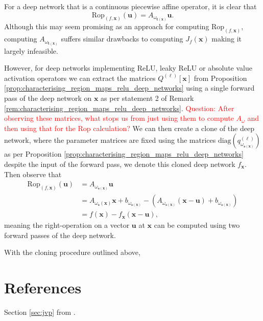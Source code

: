 For a deep network that is a continuous piecewise affine operator, it is clear that $$\mathrm{Rop}_{(f,\mathbf{x})}(\mathbf{u})=A_{\omega_{\mathbf{t}(\mathbf{x})}}\mathbf{u}.$$Although this may seem promising as an approach for computing $\mathrm{Rop}_{(f,\mathbf{x})}$, computing $A_{\omega_{\mathbf{t}(\mathbf{x})}}$ suffers similar drawbacks to computing $J_f(\mathbf{x})$ making it largely infeasible. 

However, for deep networks implementing ReLU, leaky ReLU or absolute value activation operators we can extract the matrices $Q^{(\ell)}[\mathbf{x}]$ from Proposition \ref{prop:characterising_region_maps_relu_deep_networks} using a single forward pass of the deep network on $\mathbf{x}$ as per statement 2 of Remark \ref{rem:characterising_region_maps_relu_deep_networks}. \textcolor{Red}{Question: After observing these matrices, what stops us from just using them to compute $A_{\omega}$ and then using that for the Rop calculation?} We can then create a clone of the deep network, where the parameter matrices are fixed using the matrices $\mathrm{diag}\left(q_{\omega_{\mathbf{s}(\mathbf{x})}}^{(\ell)}\right)$ as per Proposition \ref{prop:characterising_region_maps_relu_deep_networks} despite the input of the forward pass, we denote this cloned deep network $f_{\mathbf{x}}$. Then observe that 
\begin{align*}
    \mathrm{Rop}_{(f,\mathbf{x})}(\mathbf{u})&=A_{\omega_{\mathbf{s}(\mathbf{x})}}\mathbf{u}\\&=A_{\omega_{\mathbf{s}}(\mathbf{x})}\mathbf{x}+b_{\omega_{\mathbf{s}(\mathbf{x})}}-\left(A_{\omega_{\mathbf{s}(\mathbf{x})}}(\mathbf{x}-\mathbf{u})+b_{\omega_{\mathbf{s}(\mathbf{x})}}\right)\\&=f(\mathbf{x})-f_{\mathbf{x}}(\mathbf{x}-\mathbf{u}),
\end{align*}
meaning the right-operation on a vector $\mathbf{u}$ at $\mathbf{x}$ can be computed using two forward passes of the deep network.

\begin{proposition}
    With the cloning procedure outlined above, 
\end{proposition}

\section{References}

Section \ref{sec:jvp} from \citet{balestrieroFastJacobianVectorProduct2021}.